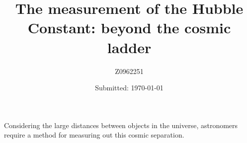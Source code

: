 \documentclass[12pt, twocolumn]{revtex4}    %
\begin{document}
                     


\title{The measurement of the Hubble Constant: beyond the cosmic ladder} 
\date{Submitted: \today{}}
\author{Z0962251}

\maketitle
\thispagestyle{plain} %

Considering the large distances between objects in the universe, astronomers require a method for measuring out this cosmic separation.

\newpage



\end{document}
